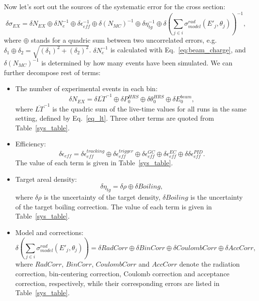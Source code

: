 Now let's sort out the sources of the systematic error for the cross section:
\begin{equation}
  \delta \sigma_{EX} = \delta N_{EX} \oplus\delta N_{e}^{-1} \oplus\delta \epsilon_{eff}^{-1}\oplus\delta (N_{MC})^{-1}\oplus\delta\eta_{tg}^{-1}\oplus\delta (\sum_{j\in i}\sigma^{rad}_{model}(E'_{j},\theta_{j}))^{-1},
\end{equation}
where $\oplus$ stands for a quadric sum between two uncorrelated errors, e.g. $\delta_{1}\oplus\delta_{2}=\sqrt{(\delta_{1})^{2} + (\delta_{2})^{2}}$. $\delta N_{e}^{-1}$ is calculated with Eq.~\ref{eq:beam_charge}, and $\delta (N_{MC})^{-1}$ is determined by how many events have been simulated. We can further decompose rest of terms:
\begin{itemize}

\item The number of experimental events in each bin:
\begin{equation}
  \delta N_{EX} = \delta \overline{LT}^{-1} \oplus\delta P_{0}^{HRS} \oplus\delta \theta_{0}^{HRS} \oplus\delta E_{0}^{beam},
\end{equation}
where $\overline{LT}^{-1}$ is the quadric sum of the live-time values for all runs in the same setting, defined by Eq.~\ref{eq_lt}. Three other terms are quoted from Table~\ref{sys_table}.

\item Efficiency:
\begin{equation}
  \delta \epsilon_{eff} = \delta \epsilon_{eff}^{tracking}\oplus\delta \epsilon_{eff}^{trigger}\oplus\delta \epsilon_{eff}^{GC}\oplus\delta \epsilon_{eff}^{EC}\oplus\delta\delta \epsilon_{eff}^{PID}.
\end{equation}
The value of each term is given in Table~\ref{sys_table}.

\item Target areal density:
\begin{equation}
  \delta \eta_{tg} = \delta\rho \oplus\delta Boiling,
\end{equation}
where $\delta\rho$ is the uncertainty of the target density, $\delta Boiling$ is the uncertainty of the target boiling correction. The value of each term is given in Table~\ref{sys_table}.

\item Model and corrections:
\begin{equation}
 \delta (\sum_{j\in i}\sigma^{rad}_{model}(E'_{j},\theta_{j})) =\delta RadCorr\oplus\delta BinCorr\oplus\delta CoulombCorr\oplus\delta AccCorr,
\end{equation}
where $RadCorr$, $BinCorr$, $CoulombCorr$ and $AccCorr$ denote the radiation correction, bin-centering correction, Coulomb correction and acceptance correction, respectively, while their corresponding errors are listed in Table~\ref{sys_table}.
\end{itemize}

